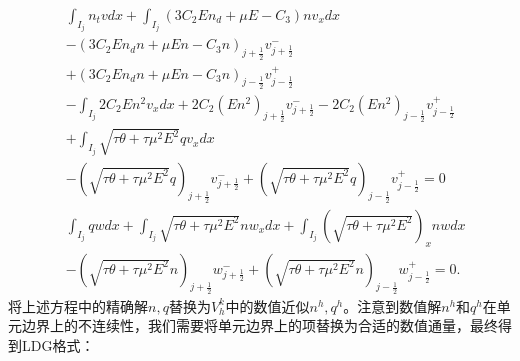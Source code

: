 \begin{align}
     & \int_{I_{j}} n_{t} v d x+\int_{I_{j}}\left(3 C_{2} E n_{d}+\mu E-C_{3}\right) n v_{x} d x                                                                          \nonumber                                              \\
     & -\left(3 C_{2} E n_{d} n+\mu E n-C_{3} n\right)_{j+\frac{1}{2}} v_{j+\frac{1}{2}}^{-}                                                                                       \nonumber                                     \\
     & +\left(3 C_{2} E n_{d} n+\mu E n-C_{3} n\right)_{j-\frac{1}{2}} v_{j-\frac{1}{2}}^{+}                                                                                      \nonumber                                      \\
     & -\int_{I_{j}} 2 C_{2} E n^{2} v_{x} d x+2 C_{2}\left(E n^{2}\right)_{j+\frac{1}{2}} v_{j+\frac{1}{2}}^{-}-2 C_{2}\left(E n^{2}\right)_{j-\frac{1}{2}} v_{j-\frac{1}{2}}^{+}           \nonumber                           \\
     & +\int_{I_{j}} \sqrt{\tau \theta+\tau \mu^{2} E^{2}} q v_{x} d x                                                                                               \nonumber                                                   \\
     & -\left(\sqrt{\tau \theta+\tau \mu^{2} E^{2}} q\right)_{j+\frac{1}{2}} v_{j+\frac{1}{2}}^{-}+\left(\sqrt{\tau \theta+\tau \mu^{2} E^{2}} q\right)_{j-\frac{1}{2}} v_{j-\frac{1}{2}}^{+}=0  \label{eq:HFRewrittenWeakForma} \\
     & \int_{I_{j}} q w d x+\int_{I_{j}} \sqrt{\tau \theta+\tau \mu^{2} E^{2}} n w_{x} d x+\int_{I_{j}}\left(\sqrt{\tau \theta+\tau \mu^{2} E^{2}}\right)_{x} n w d x    \nonumber                                               \\
     & -\left(\sqrt{\tau \theta+\tau \mu^{2} E^{2}} n\right)_{j+\frac{1}{2}} w_{j+\frac{1}{2}}^{-}+\left(\sqrt{\tau \theta+\tau \mu^{2} E^{2}} n\right)_{j-\frac{1}{2}} w_{j-\frac{1}{2}}^{+}=0 .\label{eq:HFRewrittenWeakFormb}
\end{align}
将上述方程中的精确解$n, q$替换为$V_{h}^{k}$中的数值近似$n^{h}, q^{h}$。注意到数值解$n^{h}$和$q^{h}$在单元边界上的不连续性，我们需要将单元边界上的项替换为合适的数值通量，最终得到LDG格式：
